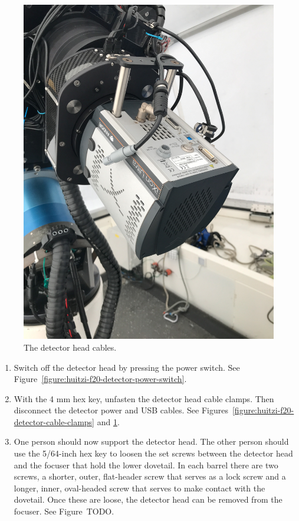 \begin{enumerate}
\begin{figure}
\begin{center}
\includegraphics[angle=0,width=0.8\linewidth]{figures/huitzi-f20-detector-cables}
\end{center}
\caption{The detector head cables.}
\label{figure:huitzi-f20-detector-cables}
\end{figure}

\begin{enumerate}    

  \item Switch off the detector head by pressing the power switch. See Figure~\ref{figure:huitzi-f20-detector-power-switch}.
  
  \item With the 4 mm hex key, unfasten the detector head cable clamps. Then disconnect the detector power and USB cables. See Figures~\ref{figure:huitzi-f20-detector-cable-clamps} and \ref{figure:huitzi-f20-detector-cables}.

  \item One person should now support the detector head. The other person should use the 5/64-inch hex key to loosen the set screws between the detector head and the focuser that hold the lower dovetail. In each barrel there are two screws, a shorter, outer, flat-header screw that serves as a lock screw and a longer, inner, oval-headed screw that serves to make contact with the dovetail. Once these are loose, the detector head can be removed from the focuser. See Figure~TODO.
  

\end{enumerate}
\end{enumerate}
